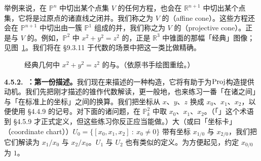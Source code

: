举例来说，在 $\mathbb{P}^n$ 中切出某个点集 $V$ 的任何方程，也会在 $\mathbb{R}^{n+1}$ 中切出某个点集，它将是过原点的诸直线之闭并。我们称之为 $V$ 的\emph{\trAffine\trCone}（affine cone）。这些方程还会在 $\mathbb{P}^{n+1}$ 中切出由一簇 $\mathbb{P}^1$ 组成的并，我们称之为 $V$ 的\emph{\trProjective\trCone}（projective cone）。\trProjective\trCone{}正是\trAffine\trCone{}与 $V$ 的\trDisjointUnion。例如，$\mathbb{P}^2$ 中 $x^2+y^2=z^2$ 的\trAffine\trCone，正是 $\mathbb{R}^3$ 中锥面的那幅「经典」图像；见图~\ref{fig:affine-projective-cone}。我们将在 \S9.3.11 于代数的场景中把这一类比做精确。

\begin{figure}[htbp]
\centering
{}
\caption{经典几何中 $x^2+y^2=z^2$ 的\trAffine\trCone{}与\trProjective\trCone。（依原书手绘图重绘。）}\label{fig:affine-projective-cone}
\end{figure}

\textbf{4.5.2.\ \trProjectiveScheme：第一份描述。}\quad 我们现在来描述\trProjectiveScheme{}的一种构造，它将有助于为$\operatorname{Proj}$构造提供动机。我们先把刚才描述的锥作代数解读，更一般地，也来练习一番「在诸\trProjective\trCoordinate{}之间」与「在标准\trAffine\trOpenSubset{}上的坐标」之间的换算。我们把坐标从 $x$、$y$、$z$ 换成 $x_0$、$x_1$、$x_2$，以便使用 \S4.4.9 的记号。对下面的诸问题，在 $\mathbb{P}^2_k$ 中取\trProjective\trCoordinate{} $x_0$、$x_1$、$x_2$。（「\trProjective\trCoordinate」这个术语到 \S4.5.9 才正式定义，但这些练习你反正应当能做。）大\trOpenSet（或曰「坐标卡」（coordinate chart））$U_0=\{[x_0,x_1,x_2]\ :\ x_0\neq0\}$ 带有坐标 $x_{1/0}$ 与 $x_{2/0}$，我们把它们解读为 $x_1/x_0$ 与 $x_2/x_0$。$U_1$ 与 $U_2$ 也有类似的定义。为方便起见，约定 $x_{0/0}$ 为 $1$。

